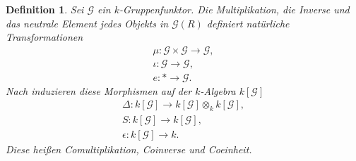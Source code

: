 \documentclass[a4paper, 11pt]{scrartcl}
\theoremstyle{basicstyle}
\newtheorem{definition}{Definition}[section]
\begin{document}
    \begin{definition}
        Sei \(\mathcal{G}\) ein \(k\)-Gruppenfunktor.
        Die Multiplikation, die Inverse und das neutrale Element jedes Objekts in \(\mathcal{G}(R)\) definiert natürliche Transformationen
        \begin{gather*}
            \mu : \mathcal{G} \times \mathcal{G} \longrightarrow \mathcal{G}, \\
            \iota : \mathcal{G} \longrightarrow \mathcal{G}, \\
            e : \ast \longrightarrow \mathcal{G}.
        \end{gather*}
        Nach  induzieren diese Morphismen auf der \(k\)-Algebra \(k[\mathcal{G}]\)
        \begin{gather*}
            \Delta : k[\mathcal{G}] \longrightarrow k[\mathcal{G}] \otimes_k k[\mathcal{G}], \\
            S: k[\mathcal{G}] \longrightarrow k[\mathcal{G}], \\
            \epsilon : k[\mathcal{G}] \longrightarrow k.
        \end{gather*}
        Diese heißen \emph{Comultiplikation}, \emph{Coinverse} und \emph{Coeinheit}.
    \end{definition}
\end{document}
